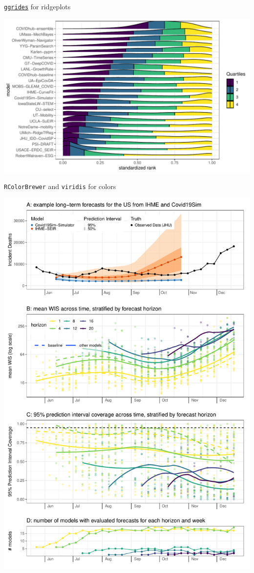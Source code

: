 \documentclass[table]{beamer}\usepackage[]{graphicx}\usepackage[]{xcolor}
\begin{document}
\begin{frame}[fragile]{\href{https://wilkelab.org/ggridges/}{{\tt ggrides}} for ridgeplots}

\includegraphics[width=\textwidth]{figure-static/fig-model-ranks}

\end{frame}


\begin{frame}[fragile]{{\tt RColorBrewer} and {\tt viridis} for colors}

\includegraphics[width=.5\textwidth]{figure-static/fig-by-horizon-week}

\end{frame}


\end{document}
